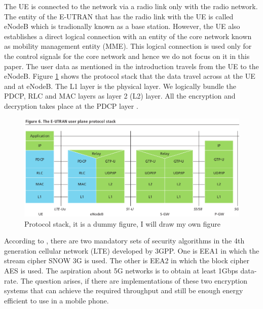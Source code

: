 \documentclass[lnicst,sechang,a4paper]{svmultln}
\begin{document}
The UE is connected to the network via a radio link only with the radio network. The entity of the E-UTRAN that has the radio link with the UE is called eNodeB which is tradionally known as a base station. However, the UE also establishes a direct logical connection with an entity of the core network known as mobility management entity (MME). This logical connection is used only for the control signals for the core network and hence we do not focus on it in this paper. The user data as mentioned in the introduction travels from the UE to the eNodeB. Figure \ref{fig:protocl_stack} shows the protocol stack that the data travel across at the UE and at eNodeB. The L1 layer is the physical layer. We logically bundle the PDCP, RLC and MAC layers as layer 2 (L2) layer. All the encryption and decryption takes place at the PDCP layer \cite{3GPP_TS_36_323}.

\begin{figure}
  \includegraphics[width=1\textwidth]{protocl_stack.png}
\caption{Protocol stack, it is a dummy figure, I will draw my own figure}
\label{fig:protocl_stack}       %
\end{figure}

According to \cite{3GPP_TS_33_401}, there are two mandatory sets of security algorithms in the 4th generation cellular network (LTE) developed by 3GPP. One is EEA1 in which the stream cipher SNOW 3G is used. The other is EEA2 in which the block cipher AES is used. The aspiration about 5G networks is to obtain at least 1Gbps data-rate. The question arises, if there are implementations of these two encryption systems that can achieve the required throughput and still be enough energy efficient to use in a mobile phone.
\end{document}
